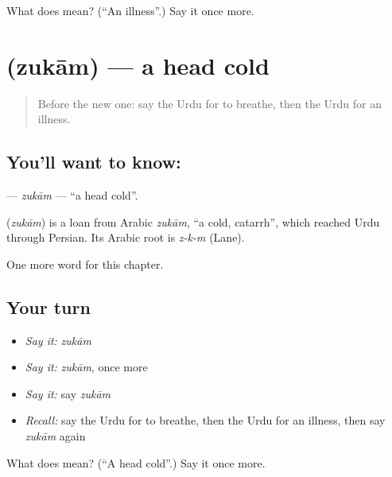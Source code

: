 \begin{tcolorbox}[breakable,colback=teal!4,colframe=teal!35!black,title={Before you move on}]
What does  mean? (\textquotedblleft{}An illness\textquotedblright{}.) Say it once more.
\end{tcolorbox}
\section[\texorpdfstring{\ur{زکام} (zukām)}{زکام (zukām)}]{ (zukām) — a head cold}

\label{lesson:UR-C152-zukam}



\begin{quote}
Before the new one: say the Urdu for to breathe, then the Urdu for an illness.
\end{quote}

\subsection*{You'll want to know: }
\textbf{} — \emph{zukām} — \textquotedblleft{}a head cold\textquotedblright{}.

\begin{cousinweb}
\textbf{} (\emph{zukām}) is a loan from Arabic \emph{zukām}, \textquotedblleft{}a cold, catarrh\textquotedblright{}, which reached Urdu through Persian. Its Arabic root is \emph{z-k-m} (Lane).
\end{cousinweb}

\begin{grammarlens}[title={What you've built}]
One more word for this chapter.
\end{grammarlens}

\subsection*{Your turn}
\begin{itemize}
\raggedright
  \item \emph{Say it:} \emph{zukām}
  \item \emph{Say it:} \emph{zukām}, once more
  \item \emph{Say it:} say \emph{zukām}
  \item \emph{Recall:} say the Urdu for to breathe, then the Urdu for an illness, then say \emph{zukām} again
\end{itemize}

\begin{tcolorbox}[breakable,colback=teal!4,colframe=teal!35!black,title={Before you move on}]
What does  mean? (\textquotedblleft{}A head cold\textquotedblright{}.) Say it once more.
\end{tcolorbox}
